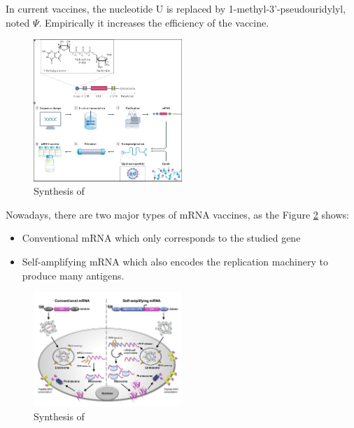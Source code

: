 \documentclass{article}
\begin{document}
            In current vaccines, the nucleotide U is replaced by 1-methyl-3'-pseudouridylyl, noted $\Psi$. Empirically it increases the efficiency of the vaccine.

                        
            \begin{figure}
                \centering
                \includegraphics[width=0.5\textwidth]{imgs/mRNA_Vaccine.JPG}
                \caption{Synthesis of \autocite{MRNAVaccinesInfectious}}
                \label{fig:mRNAvac}
            \end{figure}
            

            Nowadays, there are two major types of mRNA vaccines, as the Figure \ref{fig:mRNAtypesnext} shows:
            \begin{itemize}
                \item Conventional mRNA which only corresponds to the studied gene
                \item Self-amplifying mRNA which also encodes the replication machinery to produce many antigens.
            \end{itemize}
            
            \begin{figure}
                \centering
                \includegraphics[width=0.5\textwidth]{imgs/mRNA_action.JPG}
                \caption{Synthesis of \autocite{MRNATransformativeTechnology}}
                \label{fig:mRNAtypesnext}
            \end{figure}
\end{document}
